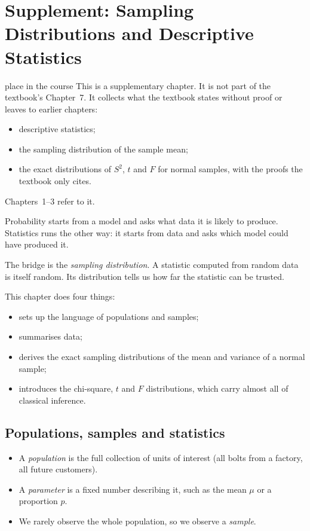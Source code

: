 \chapter{Supplement: Sampling Distributions and Descriptive Statistics}

\begin{nuance}{place in the course}
This is a supplementary chapter. It is not part of the textbook's Chapter~7. It collects what the textbook states without proof or leaves to earlier chapters:
\begin{itemize}
  \item descriptive statistics;
  \item the sampling distribution of the sample mean;
  \item the exact distributions of $S^2$, $t$ and $F$ for normal samples, with the proofs the textbook only cites.
\end{itemize}
Chapters~1--3 refer to it.
\end{nuance}

Probability starts from a model and asks what data it is likely to produce. Statistics runs the other way: it starts from data and asks which model could have produced it.

The bridge is the \emph{sampling distribution}. A statistic computed from random data is itself random. Its distribution tells us how far the statistic can be trusted.

This chapter does four things:
\begin{itemize}
  \item sets up the language of populations and samples;
  \item summarises data;
  \item derives the exact sampling distributions of the mean and variance of a normal sample;
  \item introduces the chi-square, $t$ and $F$ distributions, which carry almost all of classical inference.
\end{itemize}

\section{Populations, samples and statistics}

\begin{itemize}
  \item A \emph{population} is the full collection of units of interest (all bolts from a factory, all future customers).
  \item A \emph{parameter} is a fixed number describing it, such as the mean $\mu$ or a proportion $p$.
  \item We rarely observe the whole population, so we observe a \emph{sample}.
\end{itemize}

